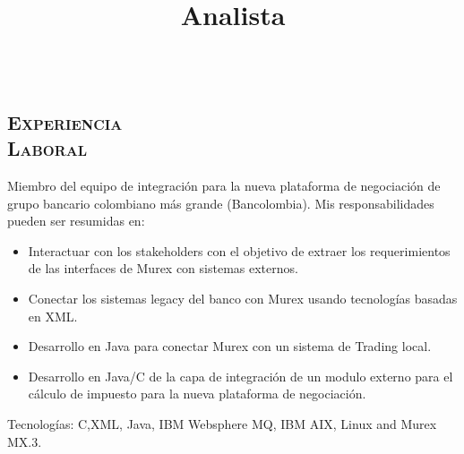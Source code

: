 \begin{resume}
\section{\textsc{\\Experiencia \\ Laboral}}


\title{\textbf{Analista} }
\begin{position}
Miembro del equipo de integraci\'{o}n para la nueva plataforma de negociaci\'{o}n de
grupo bancario colombiano m\'{a}s grande (Bancolombia). Mis responsabilidades pueden ser
resumidas en:
\begin{itemize}
\item {Interactuar con los stakeholders con el objetivo de extraer los requerimientos de las interfaces de Murex con sistemas externos.}
\item {Conectar los sistemas legacy del banco con Murex usando tecnolog\'{i}as basadas en XML.}
\item {Desarrollo en Java para conectar Murex con un sistema de Trading local.}
\item {Desarrollo en Java/C de la capa de integraci\'{o}n de un modulo externo para el c\'{a}lculo de impuesto para la nueva plataforma de negociaci\'{o}n.}
\end{itemize}

Tecnolog\'{i}as: C,XML, Java, IBM  Websphere MQ, IBM AIX, Linux and Murex MX.3.
\end{position}


\end{resume}
